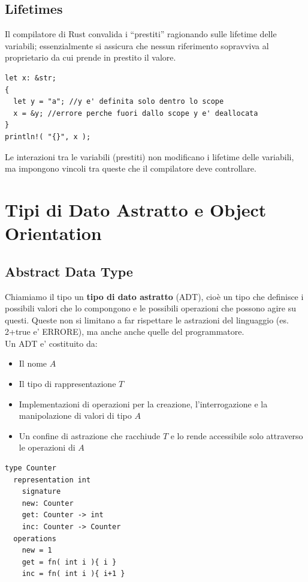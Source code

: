 \documentclass[a4paper,12pt]{article}
\begin{document}
\subsection{Lifetimes}
Il compilatore di Rust convalida i “prestiti” ragionando sulle lifetime delle variabili; essenzialmente si assicura che nessun riferimento sopravviva al proprietario da cui prende in prestito il valore.
\begin{lstlisting}
let x: &str;
{
  let y = "a"; //y e' definita solo dentro lo scope
  x = &y; //errore perche fuori dallo scope y e' deallocata
}
println!( "{}", x );
\end{lstlisting}
Le interazioni tra le variabili (prestiti) non modificano i lifetime delle variabili, ma impongono vincoli tra queste che il compilatore deve controllare.
\section{Tipi di Dato Astratto e Object Orientation}
\subsection{Abstract Data Type}
Chiamiamo il tipo un \textbf{tipo di
dato astratto} (ADT), cioè un tipo che definisce
i possibili valori che lo compongono e le
possibili operazioni che possono agire su
questi. Queste non si limitano a far rispettare le astrazioni del linguaggio (es. 2+true e' ERRORE), ma anche anche quelle del programmatore.\\
Un ADT e' costituito da:
\begin{itemize}
  \item Il nome $A$
  \item Il tipo di rappresentazione $T$
  \item Implementazioni di operazioni per la creazione, l'interrogazione e la manipolazione di valori di tipo $A$
  \item Un confine di astrazione che racchiude $T$ e lo rende accessibile solo attraverso le operazioni di $A$
\end{itemize}
\begin{lstlisting}
type Counter
  representation int
    signature
    new: Counter
    get: Counter -> int
    inc: Counter -> Counter
  operations
    new = 1
    get = fn( int i ){ i }
    inc = fn( int i ){ i+1 }
\end{lstlisting}
\end{document}
